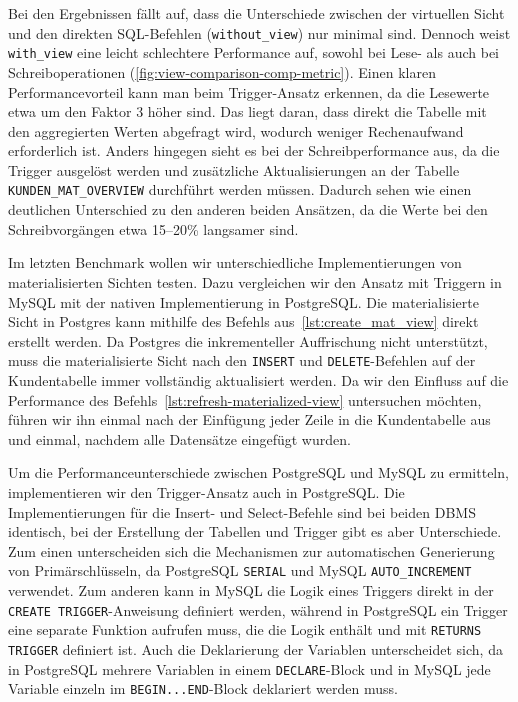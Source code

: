 Bei den Ergebnissen fällt auf, dass die Unterschiede zwischen der virtuellen Sicht und den direkten SQL-Befehlen (\texttt{without\_view}) nur minimal sind.
Dennoch weist \texttt{with\_view} eine leicht schlechtere Performance auf, sowohl bei Lese- als auch bei Schreiboperationen (\ref{fig:view-comparison-comp-metric}).
Einen klaren Performancevorteil kann man beim Trigger-Ansatz erkennen, da die Lesewerte etwa um den Faktor 3 höher sind.
Das liegt daran, dass direkt die Tabelle mit den aggregierten Werten abgefragt wird, wodurch weniger Rechenaufwand erforderlich ist.
Anders hingegen sieht es bei der Schreibperformance aus, da die Trigger ausgelöst werden und zusätzliche Aktualisierungen an der Tabelle \texttt{KUNDEN\_MAT\_OVERVIEW} durchführt werden müssen.
Dadurch sehen wie einen deutlichen Unterschied zu den anderen beiden Ansätzen, da die Werte bei den Schreibvorgängen etwa 15--20\% langsamer sind.

Im letzten Benchmark wollen wir unterschiedliche Implementierungen von materialisierten Sichten testen.
Dazu vergleichen wir den Ansatz mit Triggern in MySQL mit der nativen Implementierung in PostgreSQL\@.
Die materialisierte Sicht in Postgres kann mithilfe des Befehls aus~\ref{lst:create_mat_view} direkt erstellt werden.
Da Postgres die inkrementeller Auffrischung nicht unterstützt, muss die materialisierte Sicht nach den \texttt{INSERT} und \texttt{DELETE}-Befehlen auf der Kundentabelle immer vollständig aktualisiert werden.
Da wir den Einfluss auf die Performance des Befehls~\ref{lst:refresh-materialized-view} untersuchen möchten, führen wir ihn einmal nach der Einfügung jeder Zeile in die Kundentabelle aus und einmal, nachdem alle Datensätze eingefügt wurden.

Um die Performanceunterschiede zwischen PostgreSQL und MySQL zu ermitteln, implementieren wir den Trigger-Ansatz auch in PostgreSQL\@.
Die Implementierungen für die Insert- und Select-Befehle sind bei beiden DBMS identisch, bei der Erstellung der Tabellen und Trigger gibt es aber Unterschiede.
Zum einen unterscheiden sich die Mechanismen zur automatischen Generierung von Primärschlüsseln, da PostgreSQL \texttt{SERIAL} und MySQL \texttt{AUTO\_INCREMENT} verwendet.
Zum anderen kann in MySQL die Logik eines Triggers direkt in der \texttt{CREATE TRIGGER}-Anweisung definiert werden, während in PostgreSQL ein Trigger eine separate Funktion aufrufen muss, die die Logik enthält und mit \texttt{RETURNS TRIGGER} definiert ist.
Auch die Deklarierung der Variablen unterscheidet sich, da in PostgreSQL mehrere Variablen in einem \texttt{DECLARE}-Block und in MySQL jede Variable einzeln im \texttt{BEGIN...END}-Block deklariert werden muss.

